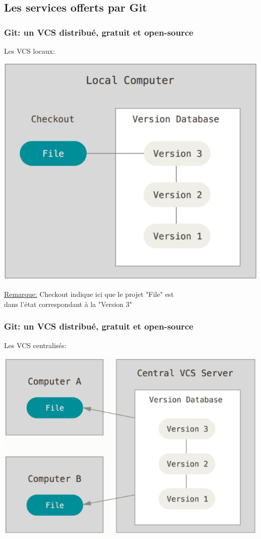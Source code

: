 \documentclass{beamer}
\begin{document}
\subsection{Les services offerts par Git}
\begin{frame}
\frametitle{Git: un VCS distribué, gratuit et open-source}
Les VCS locaux:
\begin{center}
    \includegraphics[scale=0.25]{images/vcs/vcs_local.png}
\end{center}

\underline{Remarque:} Checkout indique ici que le projet "File" est\\
\smallskip
dans l'état correspondant à la "Version 3"
\end{frame}

\begin{frame}
\frametitle{Git: un VCS distribué, gratuit et open-source}
Les VCS centralisés:
\begin{center}
    \includegraphics[scale=0.25]{images/vcs/vcs_centralized.png}
\end{center}
\end{frame}
\end{document}

